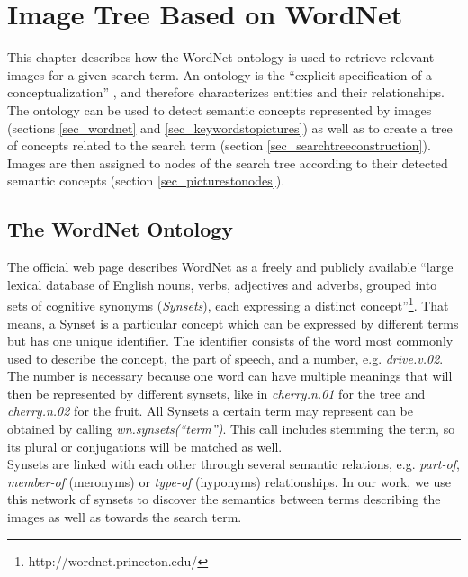 %
\section{Image Tree Based on WordNet}
\label{sec_wordnetsearchtree}
This chapter describes how the WordNet ontology is used to retrieve relevant images for a given search term. An ontology is the ``explicit specification of a conceptualization'' \cite{gruber1995ontology}, and therefore characterizes entities and their relationships. The ontology can be used to detect semantic concepts represented by images (sections \ref{sec_wordnet} and \ref{sec_keywordstopictures}) as well as to create a tree of concepts related to the search term (section \ref{sec_searchtreeconstruction}). Images are then assigned to nodes of the search tree according to their detected semantic concepts (section \ref{sec_picturestonodes}).

\subsection{The WordNet Ontology}
\label{sec_wordnet}
The official web page describes WordNet as a freely and publicly available ``large lexical database of English nouns, verbs, adjectives and adverbs, grouped into sets of cognitive synonyms (\emph{Synsets}), each expressing a distinct concept''\footnote{http://wordnet.princeton.edu/}. That means, a Synset is a particular concept which can be expressed by different terms but has one unique identifier. The identifier consists of the word most commonly used to describe the concept, the part of speech, and a number, e.g. \emph{drive.v.02}.\\
The number is necessary because one word can have multiple meanings that will then be represented by different synsets, like in \emph{cherry.n.01} for the tree and \emph{cherry.n.02} for the fruit. All Synsets a certain term may represent can be obtained by calling \emph{wn.synsets(``term'')}. This call includes stemming the term, so its plural or conjugations will be matched as well.\\

Synsets are linked with each other through several semantic relations, e.g. \emph{part-of}, \emph{member-of} (meronyms) or \emph{type-of} (hyponyms) relationships.
In our work, we use this network of synsets to discover the semantics between terms describing the images as well as towards the search term. \\

